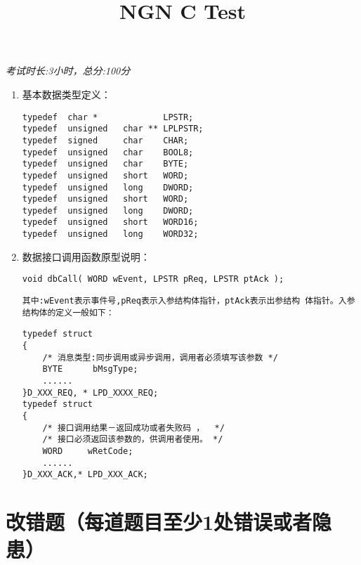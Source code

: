 ﻿\documentclass  [11pt,onecolumn]{article}
\title{NGN C Test}
\author{}
\date{}
\begin{document}
\begin{minipage}{0.9\linewidth}
\end{minipage}

\begin{flushright}
{\small{\textit{考试时长:3小时，总分:100分}}}
\end{flushright}

\normalsize{}

\begin{enumerate}
    \item 基本数据类型定义：
\begin{lstlisting}
typedef  char *             LPSTR;
typedef  unsigned   char ** LPLPSTR;
typedef  signed     char    CHAR;
typedef  unsigned   char    BOOL8;
typedef  unsigned   char    BYTE;
typedef  unsigned   short   WORD;
typedef  unsigned   long    DWORD;
typedef  unsigned   short   WORD;
typedef  unsigned   long    DWORD;
typedef  unsigned   short   WORD16;
typedef  unsigned   long    WORD32;
\end{lstlisting}
    \item 数据接口调用函数原型说明：
\begin{lstlisting}
void dbCall( WORD wEvent, LPSTR pReq, LPSTR ptAck );
\end{lstlisting}
\texttt{其中:\lstinline{wEvent}表示事件号,\lstinline{pReq}表示入参结构体指针，\lstinline{ptAck}表示出参结构
体指针。入参结构体的定义一般如下：}
\begin{lstlisting}
typedef struct 
{
    /* 消息类型:同步调用或异步调用，调用者必须填写该参数 */
    BYTE      bMsgType;  
    ......
}D_XXX_REQ, * LPD_XXXX_REQ;
typedef struct
{
    /* 接口调用结果－返回成功或者失败码 ，  */
    /* 接口必须返回该参数的，供调用者使用。 */
    WORD     wRetCode;
    ......
}D_XXX_ACK,* LPD_XXX_ACK;
\end{lstlisting}
\end{enumerate}

\section{改错题（每道题目至少1处错误或者隐患）}
\subsection{}
\end{document}
